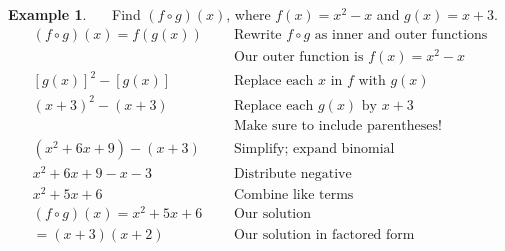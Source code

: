 \documentclass[12pt]{book}
\theoremstyle{definition}
\newtheorem{example}{Example}
\newcommand{\tmop}[1]{\ensuremath{\operatorname{#1}}}
\begin{document}
\begin{example}~~~Find $(f \circ g) (x)$, where $f (x) = x^2 - x$ and $g (x) = x + 3$.
  \begin{eqnarray*}
    (f \circ g) (x)=f (g (x)) &  & \text{Rewrite~} f\circ g \text{~as~inner~and~outer~functions}\\
	    &  & \text{Our~outer~function~is~} f(x) = x^2 - x\\
    \left[g(x)\right]^2-\left[g(x)\right]~~~~ &  & \text{Replace~each~} x \text{~in~} f \text{~with~} g(x)\\
		 (x + 3)^2 - (x + 3) &  & \text{Replace~each~} g(x) \text{~by~} x+3\\
		& & \text{Make~sure~to~include~parentheses!}\\
    (x^2 + 6 x + 9) - (x + 3)  &  & \tmop{Simplify;~expand~binomial}\\
    x^2 + 6 x + 9 - x - 3~~ &  & \tmop{Distribute~negative}\\
    x^2 + 5 x + 6~~ &  & \tmop{Combine~like~terms}\\
		(f \circ g) (x)=x^2 + 5 x + 6~~~ &  & \text{Our solution}\\
		=(x+3)(x+2) & & \text{Our~solution~in~factored~form}
  \end{eqnarray*}
\end{example}
\end{document}
